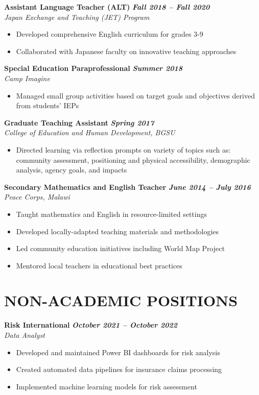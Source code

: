 \documentclass[11pt,letterpaper]{article}
\begin{document}
\textbf{Assistant Language Teacher (ALT)} \hfill \textbf{\textit{Fall 2018 -- Fall 2020}} \\
\textit{Japan Exchange and Teaching (JET) Program}
\begin{itemize}
    \item Developed comprehensive English curriculum for grades 3-9
    \item Collaborated with Japanese faculty on innovative teaching approaches
\end{itemize}

\textbf{Special Education Paraprofessional} \hfill \textbf{\textit{Summer 2018}} \\
\textit{Camp Imagine}
\begin{itemize}
    \item Managed small group activities based on target goals and objectives derived from students' IEPs
\end{itemize}

\textbf{Graduate Teaching Assistant} \hfill \textbf{\textit{Spring 2017}} \\
\textit{College of Education and Human Development, BGSU}
\begin{itemize}
    \item Directed learning via reflection prompts on variety of topics such as: community assessment, positioning and physical accessibility, demographic analysis, agency goals, and impacts
\end{itemize}

\textbf{Secondary Mathematics and English Teacher} \hfill \textbf{\textit{June 2014 -- July 2016}} \\
\textit{Peace Corps, Malawi}
\begin{itemize}
    \item Taught mathematics and English in resource-limited settings
    \item Developed locally-adapted teaching materials and methodologies
    \item Led community education initiatives including World Map Project
    \item Mentored local teachers in educational best practices
\end{itemize}

\section{NON-ACADEMIC POSITIONS}

\textbf{Risk International} \hfill \textbf{\textit{October 2021 -- October 2022}} \\
\textit{Data Analyst}
\begin{itemize}
    \item Developed and maintained Power BI dashboards for risk analysis
    \item Created automated data pipelines for insurance claims processing
    \item Implemented machine learning models for risk assessment
\end{itemize}
\end{document}
